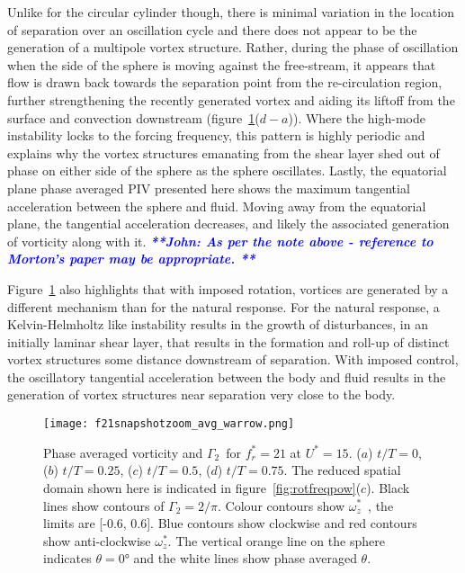 \documentclass[3p]{elsarticle}
\newcommand{\Ustar}{\ensuremath{U^{*}}}
\newcommand{\freqrat}{\ensuremath{f_r^*}}
\newcommand{\gtwo}{\ensuremath{\Gamma_2}}
\newcommand{\wz}{\ensuremath{\omega_z^*}}
\newcommand{\js}[1]{{\textcolor{blue}{{\bf{\it{ **John: #1 **}}}}}}
\begin{document}
Unlike for the circular cylinder though, there is minimal variation in the
location of separation over an oscillation cycle and there does not
appear to be the generation of a multipole vortex structure. Rather,
during the phase of oscillation when the side of the sphere is moving
against the free-stream, it appears that flow is drawn back towards
the separation point from the re-circulation region, further
strengthening the recently generated vortex and aiding its liftoff
from the surface and convection downstream
(figure~\ref{fig:f21snapshotzoom_avg}($d-a$)). Where the high-mode instability locks to the forcing frequency, this
pattern is highly periodic and explains why the vortex structures emanating
from the shear layer shed out of phase on either side of the sphere as
the sphere oscillates. Lastly, the equatorial plane phase averaged PIV presented here
shows the maximum tangential acceleration between the sphere and
fluid. Moving away from the equatorial plane, the tangential
acceleration decreases, and likely the associated generation of
vorticity along with it. \js{As per the note above - reference to Morton's paper may be appropriate.}

Figure~\ref{fig:f21snapshotzoom_avg} also highlights that with imposed
rotation, vortices are generated by a different mechanism than for the
natural response. For the natural response, a Kelvin-Helmholtz like
instability results in the growth of disturbances, in an initially
laminar shear layer, that results in the formation and roll-up of distinct
vortex structures some distance downstream of separation. With imposed
control, the oscillatory tangential acceleration between the body and
fluid results in the generation of vortex structures near separation very close to the body.
%
\begin{figure}
	\centering
	\texttt{[image: f21snapshotzoom\_avg\_warrow.png]}
	\caption{Phase averaged vorticity and \gtwo~for $\freqrat=21$
		at $\Ustar=15$. ($a$) $t/T=0$, ($b$) $t/T=0.25$, ($c$)
		$t/T=0.5$, ($d$) $t/T=0.75$. The reduced spatial domain
		shown here is indicated in figure~\ref{fig:rotfreqpow}($c$).
		Black lines show contours of $\gtwo= 2/\pi$. Colour contours show \wz~, the limits are [-0.6, 0.6].  Blue contours show clockwise and red contours show anti-clockwise \wz. The vertical orange line on the sphere
		indicates $\theta = \ang{0}$ and the white lines show phase averaged
		$\theta$.}
	\label{fig:f21snapshotzoom_avg}
\end{figure}
%
\end{document}
